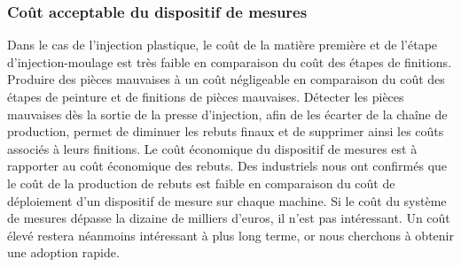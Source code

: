 \subsubsection{Coût acceptable du dispositif de mesures}
Dans le cas de l’injection plastique, le coût de la matière première et de l’étape d’injection-moulage est très faible en comparaison du coût des étapes de finitions. Produire des pièces mauvaises à un coût négligeable en comparaison du coût des étapes de peinture et de finitions de pièces mauvaises.
Détecter les pièces mauvaises dès la sortie de la presse d’injection, afin de les écarter de la chaîne de production, permet de diminuer les rebuts finaux et de supprimer ainsi les coûts associés à leurs finitions.
Le coût économique du dispositif de mesures est à rapporter au coût économique des rebuts.
Des industriels nous ont confirmés que le coût de la production de rebuts est faible en comparaison du coût de déploiement d’un dispositif de mesure sur chaque machine.
Si le coût du système de mesures dépasse la dizaine de milliers d’euros, il n’est pas intéressant.
Un coût élevé restera néanmoins intéressant à plus long terme, or nous cherchons à obtenir une adoption rapide.

